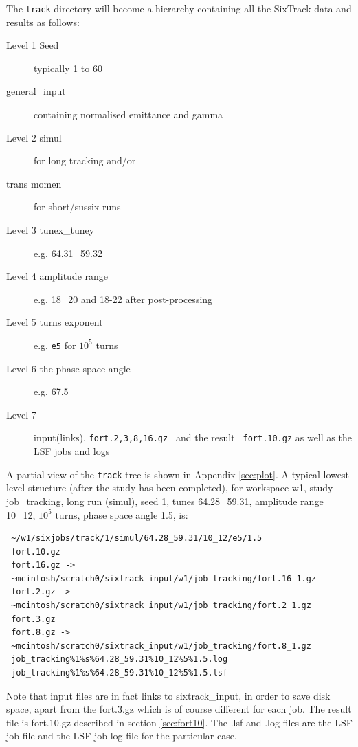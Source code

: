 \documentclass{cernatsnote}
\begin{document}
The \texttt{track} directory will become a hierarchy containing all the SixTrack
data and results as follows:
\begin{description}
\item [Level 1 Seed] typically 1 to 60
\item [        general\_input] containing normalised emittance and gamma
\item [Level 2 simul] for long tracking and/or 
\item [        trans momen] for short/sussix runs
\item [Level 3 tunex\_tuney] e.g. 64.31\_59.32
\item [Level 4 amplitude range] e.g. 18\_20 and 18-22 after post-processing
\item [Level 5 turns exponent] e.g. \texttt{e5} for $10^5$ turns
\item [Level 6 the phase space angle] e.g. 67.5  
\item [Level 7] input(links), \texttt{fort.2,3,8,16.gz } and the result {\tt
  fort.10.gz} as well as the LSF jobs and logs
\end{description}
A partial view of the \texttt{track} tree is shown in Appendix \ref{sec:plot}.  A
typical lowest level structure (after the study has been completed),
for workspace w1, study job\_tracking, long run (simul), seed 1, tunes
64.28\_59.31, amplitude range 10\_12, $10^5$ turns, phase space angle 1.5, is:
\begin{verbatim}
 ~/w1/sixjobs/track/1/simul/64.28_59.31/10_12/e5/1.5
 fort.10.gz
 fort.16.gz -> 
 ~mcintosh/scratch0/sixtrack_input/w1/job_tracking/fort.16_1.gz
 fort.2.gz -> 
 ~mcintosh/scratch0/sixtrack_input/w1/job_tracking/fort.2_1.gz
 fort.3.gz
 fort.8.gz -> 
 ~mcintosh/scratch0/sixtrack_input/w1/job_tracking/fort.8_1.gz
 job_tracking%1%s%64.28_59.31%10_12%5%1.5.log
 job_tracking%1%s%64.28_59.31%10_12%5%1.5.lsf
\end{verbatim}
Note that input files are in fact links to sixtrack\_input, in order to save
disk space, apart from the fort.3.gz which is of course different for each job.
The result file is fort.10.gz described in section \ref{sec:fort10}. The .lsf
and .log files are the LSF job file and the LSF job log file for the particular
case.
\end{document}
